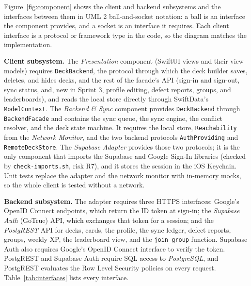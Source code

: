 \documentclass[12pt,letterpaper]{article}
\begin{document}
Figure~\ref{fig:component} shows the client and backend subsystems and the interfaces
between them in UML 2 ball-and-socket notation: a ball is an interface the component
provides, and a socket is an interface it requires. Each client interface is a protocol
or framework type in the code, so the diagram matches the implementation.

\textbf{Client subsystem.} The \emph{Presentation} component (SwiftUI views and their
view models) requires \texttt{DeckBackend}, the protocol through which the deck builder
saves, deletes, and hides decks, and the rest of the facade's API (sign-in and
sign-out, sync status, and, new in Sprint 3, profile editing, defect reports, groups,
and leaderboards), and reads the local store directly through SwiftData's
\texttt{ModelContext}. The \emph{Backend \& Sync} component provides
\texttt{DeckBackend} through \texttt{BackendFacade} and contains the sync queue, the
sync engine, the conflict resolver, and the deck state machine. It requires the local
store, \texttt{Reachability} from the \emph{Network Monitor}, and the two backend
protocols \texttt{AuthProviding} and \texttt{RemoteDeckStore}. The \emph{Supabase
Adapter} provides those two protocols; it is the only component that imports the
Supabase and Google Sign-In libraries (checked by \texttt{check-imports.sh}, risk R7),
and it stores the session in the iOS Keychain. Unit tests replace the adapter and the
network monitor with in-memory mocks, so the whole client is tested without a network.

\textbf{Backend subsystem.} The adapter requires three HTTPS interfaces: Google's OpenID
Connect endpoints, which return the ID token at sign-in; the \emph{Supabase Auth}
(GoTrue) API, which exchanges that token for a session; and the \emph{PostgREST} API for
decks, cards, the profile, the sync ledger, defect reports, groups, weekly XP, the
leaderboard view, and the \texttt{join\_group} function. Supabase Auth also requires Google's
OpenID Connect interface to verify the token. PostgREST and Supabase Auth require SQL
access to \emph{PostgreSQL}, and PostgREST evaluates the Row Level Security policies on
every request. Table~\ref{tab:interfaces} lists every interface.
\end{document}
